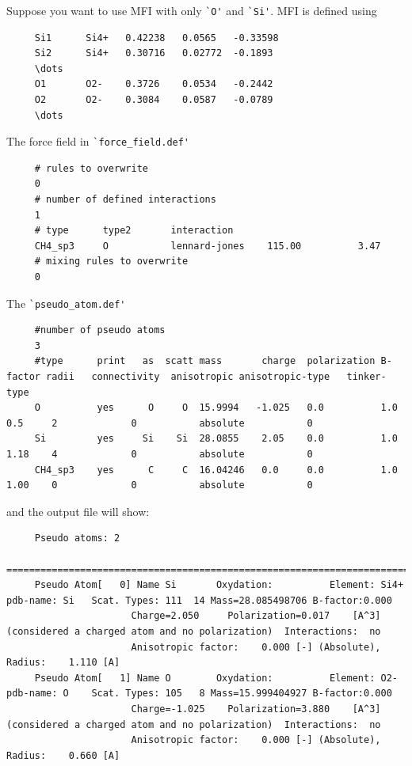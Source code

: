 Suppose you want to use MFI with only \verb=`O'= and \verb=`Si'=. MFI is defined using 
\begin{verbatim}
     Si1      Si4+   0.42238   0.0565   -0.33598
     Si2      Si4+   0.30716   0.02772  -0.1893 
     \dots
     O1       O2-    0.3726    0.0534   -0.2442 
     O2       O2-    0.3084    0.0587   -0.0789 
     \dots
\end{verbatim}


The force field in \verb=`force_field.def'=
\begin{verbatim}
     # rules to overwrite
     0
     # number of defined interactions
     1
     # type      type2       interaction
     CH4_sp3     O           lennard-jones    115.00          3.47
     # mixing rules to overwrite
     0
\end{verbatim}
The \verb=`pseudo_atom.def'=
\begin{scriptsize}
\begin{verbatim}
     #number of pseudo atoms
     3
     #type      print   as  scatt mass       charge  polarization B-factor radii   connectivity  anisotropic anisotropic-type   tinker-type
     O          yes      O     O  15.9994   -1.025   0.0          1.0      0.5     2             0           absolute           0
     Si         yes     Si    Si  28.0855    2.05    0.0          1.0      1.18    4             0           absolute           0
     CH4_sp3    yes      C     C  16.04246   0.0     0.0          1.0      1.00    0             0           absolute           0
\end{verbatim}
\end{scriptsize}
and the output file will show:
\begin{scriptsize}
\begin{verbatim}
     Pseudo atoms: 2
     ===========================================================================
     Pseudo Atom[   0] Name Si       Oxydation:          Element: Si4+ pdb-name: Si   Scat. Types: 111  14 Mass=28.085498706 B-factor:0.000
                      Charge=2.050     Polarization=0.017    [A^3] (considered a charged atom and no polarization)  Interactions:  no
                      Anisotropic factor:    0.000 [-] (Absolute), Radius:    1.110 [A]
     Pseudo Atom[   1] Name O        Oxydation:          Element: O2-  pdb-name: O    Scat. Types: 105   8 Mass=15.999404927 B-factor:0.000
                      Charge=-1.025    Polarization=3.880    [A^3] (considered a charged atom and no polarization)  Interactions:  no
                      Anisotropic factor:    0.000 [-] (Absolute), Radius:    0.660 [A]
\end{verbatim}
\end{scriptsize}


